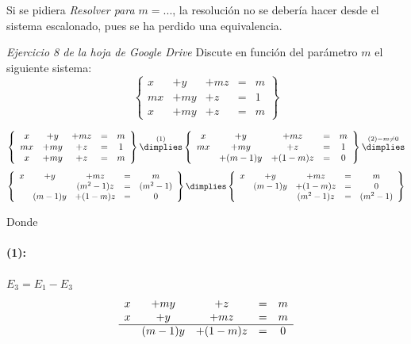 \documentclass[palatino,nosec,nochap]{Docencia}
\begin{document}
\begin{problem}
\obs Si se pidiera \textit{Resolver para $m=...$}, la resolución no se debería hacer desde el sistema escalonado, pues se ha perdido una equivalencia.  


\end{problem}





\newpage

\begin{problem} \textit{Ejercicio 8 de la hoja de Google Drive}
Discute en función del parámetro $m$ el siguiente sistema:
\[
\left\{
\begin{array}{ccccc}
x&+y&+mz&=&m\\
mx&+my&+z&=&1\\
x&+my&+z&=&m
\end{array}
\right\}
\]

\solution

\[
\left\{
\begin{array}{ccccc}
x&+y&+mz&=&m\\
mx&+my&+z&=&1\\
x&+my&+z&=&m
\end{array}
\right\}
\overset{(1)}{\dimplies}
\left\{
\begin{array}{ccccc}
x&+y&+mz&=&m\\
mx&+my&+z&=&1\\
&+(m-1)y&+(1-m)z&=&0
\end{array}
\right\}
\overset{(2) - m\neq 0}{\dimplies}
\]
\[
\left\{
\begin{array}{ccccc}
x&+y&+mz&=&m\\
&&(m^2-1)z&=&(m^2-1)\\
&(m-1)y&+(1-m)z&=&0\\
\end{array}
\right\}
\dimplies
\left\{
\begin{array}{ccccc}
x&+y&+mz&=&m\\
&(m-1)y&+(1-m)z&=&0\\
&&(m^2-1)z&=&(m^2-1)\\
\end{array}
\right\}
\]

Donde 
\paragraph{(1):} $E_3 = E_1-E_3$
\[
	\begin{array}{ccccc}
		x&+my&+z&=&m\\
		x&+y&+mz&=&m\\
		\hline
		&(m-1)y&+(1-m)z&=&0
	\end{array}
\]


\end{problem}
\end{document}
